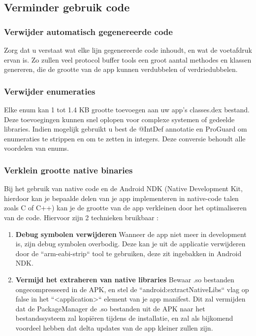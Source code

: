 \subsection{Verminder gebruik code}
\label{sec:reducecode}

\subsubsection{Verwijder automatisch gegenereerde code}
\label{sec:reducegeneratedcode}
Zorg dat u verstaat wat elke lijn gegenereerde code inhoudt, en wat de voetafdruk ervan is. Zo zullen veel protocol buffer tools een groot aantal methodes en klassen genereren, die de grootte van de app kunnen verdubbelen of verdriedubbelen.

\subsubsection*{Verwijder enumeraties}
\label{sec:removeenumerations}
Elke enum kan 1 tot 1.4 KB grootte toevoegen aan uw app's classes.dex bestand. Deze toevoegingen kunnen snel oplopen voor complexe systemen of gedeelde libraries. Indien mogelijk gebruikt u best de @IntDef annotatie en ProGuard om enumeraties te strippen en om te zetten in integers. Deze conversie behoudt alle voordelen van enums. 
\subsubsection*{Verklein grootte native binaries}
\label{sec:reducesizenativebinaries}
Bij het gebruik van native code en de Android NDK (Native Development Kit, hierdoor kan je bepaalde delen van je app implementeren in native-code talen zoals C of C++) kan je de grootte van de app verkleinen door het optimaliseren van de code. Hiervoor zijn 2 technieken bruikbaar :
\begin{enumerate}
	\item \textbf{Debug symbolen verwijderen} \newline
	Wanneer de app niet meer in development is, zijn debug symbolen overbodig. Deze kan je uit de applicatie verwijderen door de ``arm-eabi-strip`` tool te gebruiken, deze zit ingebakken in Android NDK.
	\item \textbf{Vermijd het extraheren van native libraries} \newline
	Bewaar .so bestanden ongecompresseerd in de APK, en stel de ``android:extractNativeLibs`` vlag op false in het ``<application>`` element van je app manifest. Dit zal vermijden dat de PackageManager de .so bestanden uit de APK naar het bestandssysteem zal kopiëren tijdens de installatie, en zal als bijkomend voordeel hebben dat delta updates van de app kleiner zullen zijn. 
\end{enumerate}

